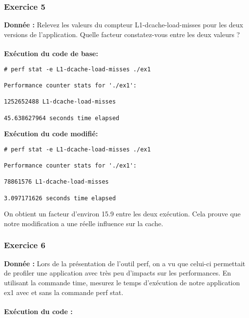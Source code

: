 \subsubsection{Exercice 5}
\textbf{Donnée : } Relevez	les	valeurs	du	compteur	L1-dcache-load-misses	pour	les	deux	versions	de	l'application.	Quelle	
facteur	constatez-vous	entre	les	deux	valeurs	?\\\\

\textbf{Exécution du code de base: } \\
\begin{lstlisting}
# perf stat -e L1-dcache-load-misses ./ex1 

Performance counter stats for './ex1':

1252652488 L1-dcache-load-misses                                       

45.638627964 seconds time elapsed
\end{lstlisting}

\textbf{Exécution du code modifié: } \\
\begin{lstlisting}
# perf stat -e L1-dcache-load-misses ./ex1 

Performance counter stats for './ex1':

78861576 L1-dcache-load-misses                                       

3.097171626 seconds time elapsed

\end{lstlisting}

On obtient un facteur d'environ 15.9 entre les deux exécution. Cela prouve que notre modification a une réelle influence sur la cache.

\subsubsection{Exercice 6}
\textbf{Donnée : } Lors	de	la	présentation	de	l'outil	perf,	on	a	vu	que	celui-ci	permettait	de	profiler	une	application	avec	
très	peu	d'impacts	sur	les	performances.	En	utilisant	la	commande	time,	mesurez	le	temps	d'exécution	
de	notre	application	ex1	avec	et	sans	la	commande	perf	stat.\\\\

\textbf{Exécution du code : } \\
\begin{lstlisting}

\end{lstlisting}

